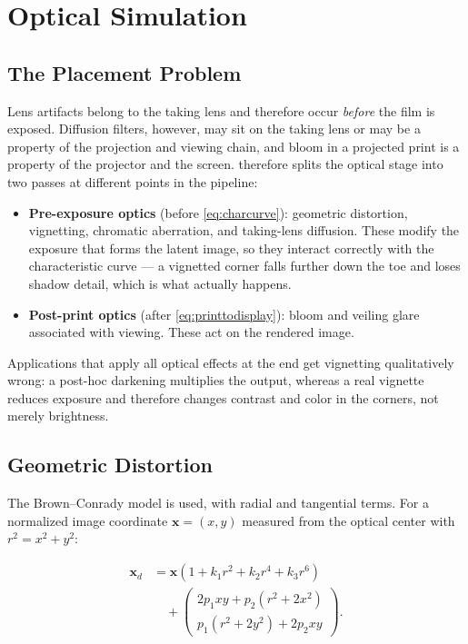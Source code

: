 \section{Optical Simulation}
\label{sec:optical}

\subsection{The Placement Problem}

Lens artifacts belong to the taking lens and therefore occur \emph{before} the
film is exposed. Diffusion filters, however, may sit on the taking lens or may
be a property of the projection and viewing chain, and bloom in a projected
print is a property of the projector and the screen. \EM{} therefore splits the
optical stage into two passes at different points in the pipeline:

\begin{itemize}
\item \textbf{Pre-exposure optics} (before \eqref{eq:charcurve}): geometric
distortion, vignetting, chromatic aberration, and taking-lens diffusion. These
modify the exposure that forms the latent image, so they interact correctly with
the characteristic curve --- a vignetted corner falls further down the toe and
loses shadow detail, which is what actually happens.
\item \textbf{Post-print optics} (after \eqref{eq:printtodisplay}): bloom and
veiling glare associated with viewing. These act on the rendered image.
\end{itemize}

Applications that apply all optical effects at the end get vignetting
qualitatively wrong: a post-hoc darkening multiplies the output, whereas a real
vignette reduces exposure and therefore changes contrast and color in the
corners, not merely brightness.

\subsection{Geometric Distortion}

The Brown--Conrady model is used, with radial and tangential terms. For a
normalized image coordinate $\mathbf{x} = (x, y)$ measured from the optical
center with $r^2 = x^2 + y^2$:

\begin{align}
\mathbf{x}_d &= \mathbf{x}\left(1 + k_1 r^2 + k_2 r^4 + k_3 r^6\right) \nonumber \\
&\quad + \begin{pmatrix} 2 p_1 x y + p_2 (r^2 + 2x^2) \\ p_1 (r^2 + 2y^2) + 2 p_2 x y \end{pmatrix}.
\label{eq:distortion}
\end{align}

